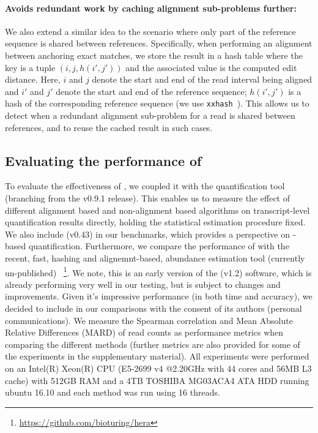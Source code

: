 \paragraph{Avoids redundant work by caching alignment sub-problems further:} We also extend a similar idea to the 
scenario where only part of the reference sequence is shared between references.  Specifically, when performing an 
alignment between anchoring exact matches, we store the result in a hash table where the key is a tuple 
$\left(i,j,h\left(i', j'\right)\right)$ and the associated value is the computed edit distance.  Here, $i$ 
and $j$ denote the start and end of the read interval being aligned and $i'$ and $j'$ denote the start and 
end of the reference sequence; $h(i',j')$ is a hash of the corresponding reference sequence 
(we use \texttt{xxhash}~\citep{xxhash}).  This allows us to detect when a redundant alignment sub-problem for 
a read is shared between references, and to reuse the cached result in such cases.


\subsection{Evaluating the performance of \sla}


To evaluate the effectiveness of \sla, we coupled it with the quantification tool \salmon (branching from the v0.9.1 release). This enables us to measure the effect of different alignment based and non-alignment based algorithms on transcript-level quantification results directly, holding the statistical estimation procedure fixed. We also include \kallisto(v0.43) in our benchmarks, which provides a perspective on \pa-based quantification. Furthermore, we compare the performance of \sla with the recent, fast, hashing and alignemnt-based, abundance estimation tool (currently un-published) \hera~\footnote{\url{https://github.com/bioturing/hera}}. We note, this is an early version of the \hera(v1.2) software, which is already performing very well in our testing, but is subject to changes and improvements. Given it's impressive performance (in both time and accuracy), we decided to include \hera in our comparisons with the consent of its authors (personal communications). We measure the Spearman correlation and Mean Absolute Relative Differences (MARD) of read counts as performance metrics when comparing the different methods (further metrics are also provided for some of the experiments in the supplementary material). All experiments were performed on an Intel(R) Xeon(R) CPU (E5-2699 v4 @2.20GHz with 44 cores and 56MB L3 cache) with 512GB RAM and a 4TB TOSHIBA MG03ACA4 ATA HDD running ubuntu 16.10 and each method was run using 16 threads.

